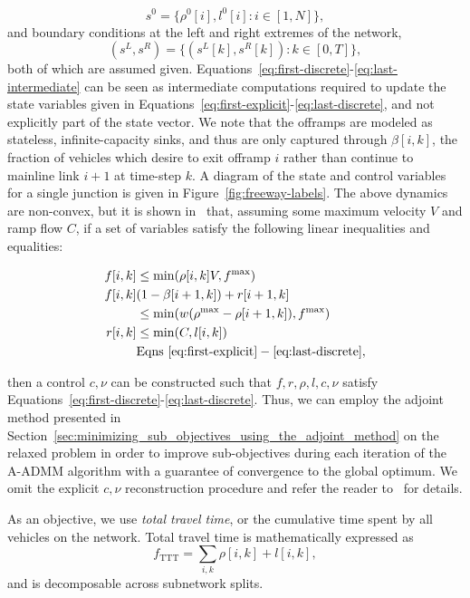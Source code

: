 \[
s^0=\{\rho^0\left[i\right], l^0\left[i\right]: i\in \left[1,N\right] \},
\]
and boundary conditions at the left and right extremes of the network,
\[
\left(s^L, s^R\right)=\{\left(s^L\left[k\right],s^R\left[k\right]\right):k\in \left[0,T\right]\},
\]
both of which are assumed given. Equations~\eqref{eq:first-discrete}-\eqref{eq:last-intermediate} can be seen as intermediate computations required to update the state variables given in Equations~\eqref{eq:first-explicit}-\eqref{eq:last-discrete}, and not explicitly part of the state vector. We note that the offramps are modeled as stateless, infinite-capacity sinks, and thus are only captured through $\beta\left[i,k\right]$, the fraction of vehicles which desire to exit offramp $i$ rather than continue to mainline link $i+1$ at time-step $k$. A diagram of the state and control variables for a single junction is given in Figure~\ref{fig:freeway-labels}. The above dynamics are non-convex, but it is shown in~\cite{Muralidharana} that, assuming some maximum velocity $V$ and ramp flow $C$, if a set of variables satisfy the following linear inequalities and equalities:

\begin{align}
f\left[i,k\right] & \le \min\left(\rho\left[i,k\right] V, f^{\max} \right) \label{eq:relax1}\\
f\left[i, k\right] & (1 - \beta\left[i+1,k\right]) + r\left[i+1,k\right] \\
 & \le \min\left(w\left(\rho^{\max} - \rho\left[i+1,k\right]\right), f^{\max}\right) \nonumber \\
r\left[i,k\right] &  \le \min\left(C, l\left[i,k\right]\right) \label{eq:relax2} \\
& \text{Eqns}~\eqref{eq:first-explicit}-\eqref{eq:last-discrete}, \nonumber
\end{align}

then a control $c,\nu$ can be constructed such that $f,r,\rho, l, c, \nu$ satisfy Equations~\eqref{eq:first-discrete}-\eqref{eq:last-discrete}. Thus, we can employ the adjoint method presented in Section~\ref{sec:minimizing_sub_objectives_using_the_adjoint_method} on the relaxed problem in order to improve sub-objectives during each iteration of the A-ADMM algorithm with a guarantee of convergence to the global optimum. We omit the explicit $c,\nu$ reconstruction procedure and refer the reader to~\cite{Muralidharana} for details.

As an objective, we use \emph{total travel time}, or the cumulative time spent by all vehicles on the network. Total travel time is mathematically expressed as
\[
f_{\text{TTT}} = \sum_{i,k} \rho\left[i,k\right] + l\left[i,k\right],
\] and is decomposable across subnetwork splits.

